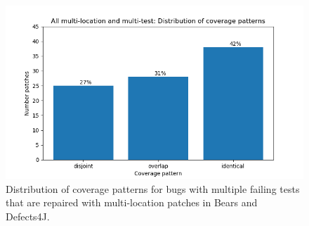 \begin{figure}
	\includegraphics[width=\linewidth]{img/coverage-all.png}
	\caption{Distribution of coverage patterns for bugs with multiple failing
      tests that are repaired with multi-location patches in Bears and Defects4J.}
	\label{fig:coverage-all}
\end{figure}


